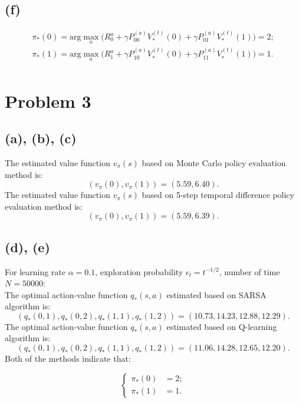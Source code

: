 \documentclass[12pt]{article}
\begin{document}
\subsection*{(f)}
\begin{align*}
\pi_{*}(0) = \mathrm{arg} \max_a \bigg(  R_0^a + \gamma P_{00}^{(a)} V_{*}^{(t)}(0) +   \gamma P_{01}^{(a)} V_{*}^{(t)}(1)  \bigg) =  2; \\
\pi_{*}(1) = \mathrm{arg} \max_a \bigg(  R_1^a + \gamma P_{10}^{(a)} V_{*}^{(t)}(0) +   \gamma P_{11}^{(a)} V_{*}^{(t)}(1)  \bigg) =  1. \\
\end{align*}




\section*{Problem 3}

\subsection*{(a), (b), (c)}

The estimated value function $v_{\pi}(s)$ based on Monte Carlo policy evaluation method is: 
$$  (v_{\pi}(0), v_{\pi}(1)) = (5.59, 6.40). $$
The estimated value function $v_{\pi}(s)$ based on  5-step temporal difference policy evaluation method is:
$$  (v_{\pi}(0), v_{\pi}(1)) = (5.59, 6.39). $$

\subsection*{(d), (e)}
For learning rate $\alpha = 0.1$, exploration probability $\epsilon_t = t^{-1/2}$, number of time $N = 50000$: \\
The optimal action-value function $q_{*}(s, a)$ estimated based on SARSA algorithm is:
$$ (q_{*}(0, 1), q_{*}(0, 2), q_{*}(1, 1), q_{*}(1, 2)) = (10.73, 14.23, 12.88, 12.29). $$
The optimal action-value function $q_{*}(s, a)$ estimated based on Q-learning algorithm is:
$$ (q_{*}(0, 1), q_{*}(0, 2), q_{*}(1, 1), q_{*}(1, 2)) = (11.06, 14.28, 12.65, 12.20). $$
Both of the methods indicate that:

\begin{equation*}
\left\{
\begin{aligned}
\pi_{*}(0) &=  2; \\
\pi_{*}(1) &=  1. 
\end{aligned}
\right.
\end{equation*}
\end{document}
